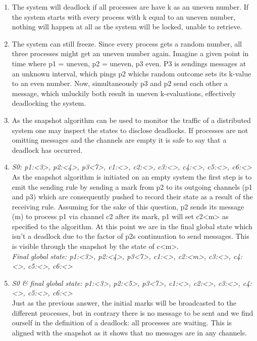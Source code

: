 \begin{enumerate}
\item The system will deadlock if all processes are have k as an uneven number. If the system starts with every process with k equal to an uneven number, nothing will happen at all as the system will be locked, unable to retrieve.
\item The system can still freeze. Since every process gets a random number, all three processes might get an uneven number again. Imagine a given point in time where p1 = uneven, p2 = uneven, p3 even. P3 is sendings messages at an unknown interval, which pings p2 whichs random outcome sets its k-value to an even number. Now, simultaneously p3 and p2 send each other a message, which unluckily both result in uneven k-evaluations, effectively deadlocking the system.
\item As the snapshot algorithm can be used to monitor the traffic of a distributed system one may inspect the states to disclose deadlocks. If processes are not omitting messages and the channels are empty it is safe to say that a deadlock has occurred.
\item \emph{S0: p1:<3>, p2:<4>, p3<7>, c1:<>, c2:<>, c3:<>, c4:<>, c5:<>, c6:<>} \\
As the snapshot algorithm is initiated on an empty system the first step is to emit the sending rule by sending a mark from p2 to its outgoing channels (p1 and p3) which are consequently pushed to record their state as a result of the receiving rule. Assuming for the sake of this question, p2 sends its message (m) to process p1 via channel c2 after its mark, p1 will set c2<m> as specified to the algorithm. At this point we are in the final global state which isn’t a deadlock due to the factor of p2s continuation to send messages. This is visible through the snapshot by the state of c<m>.\\
\emph{Final global state: p1:<3>, p2:<4>, p3<7>, c1:<>, c2:<m>, c3:<>, c4:<>, c5:<>, c6:<>}
\item \emph{S0 \& final global state: p1:<3>, p2:<5>, p3<7>, c1:<>, c2:<>, c3:<>, c4:<>, c5:<>, c6:<>} \\
Just as the previous answer, the initial marks will be broadcasted to the different processes, but in contrary there is no message to be sent and we find ourself in the definition of a deadlock: all processes are waiting. This is aligned with the snapshot as it shows that no messages are in any channels.
\end{enumerate}